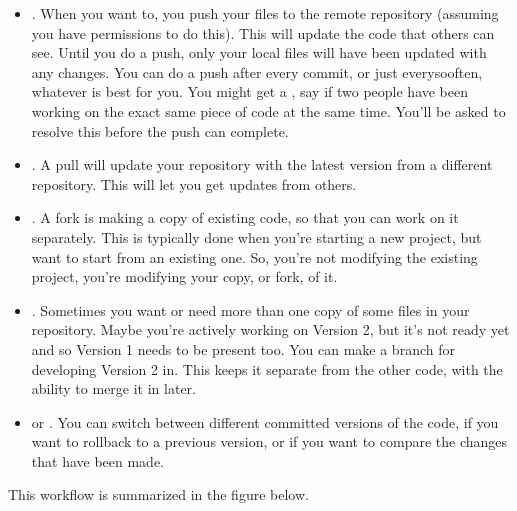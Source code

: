 \documentclass[letterpaper,10pt,british]{sphinxmanual}
\let\sphinxpxdimen\pdfpxdimen\else\newdimen\sphinxpxdimen
\begin{document}
\begin{itemize}
\item {} 
\sphinxAtStartPar
{}. When you want to, you push your files to the remote repository (assuming you have permissions to do this). This will update the code that others can see. Until you do a push, only your local files will have been updated with any changes. You can do a push after every commit, or just every\sphinxhyphen{}so\sphinxhyphen{}often, whatever is best for you. You might get a , say if two people have been working on the exact same piece of code at the same time. You’ll be asked to resolve this before the push can complete.

\item {} 
\sphinxAtStartPar
{}. A pull will update your repository with the latest version from a different repository. This will let you get updates from others.

\item {} 
\sphinxAtStartPar
{}. A fork is making a copy of existing code, so that you can work on it separately. This is typically done when you’re starting a new project, but want to start from an existing one. So, you’re not modifying the existing project, you’re modifying your copy, or fork, of it.

\item {} 
\sphinxAtStartPar
{}. Sometimes you want or need more than one copy of some files in your repository. Maybe you’re actively working on Version 2, but it’s not ready yet and so Version 1 needs to be present too. You can make a branch for developing Version 2 in. This keeps it separate from the other code, with the ability to merge it in later.

\item {} 
\sphinxAtStartPar
{} or . You can switch between different committed versions of the code, if you want to roll\sphinxhyphen{}back to a previous version, or if you want to compare the changes that have been made.

\end{itemize}

\sphinxAtStartPar
This workflow is summarized in the figure below.

\begin{figure}[htbp]
\centering

\noindent\sphinxincludegraphics[width=800\sphinxpxdimen]{{git_workflow}.png}
\end{figure}
\end{document}

